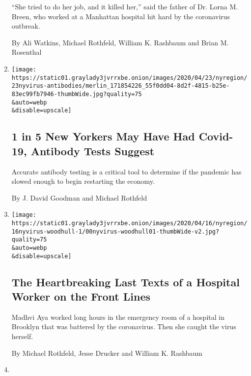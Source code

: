 \begin{enumerate}
  ``She tried to do her job, and it killed her,'' said the father of Dr.
  Lorna M. Breen, who worked at a Manhattan hospital hit hard by the
  coronavirus outbreak.

  By Ali Watkins, Michael Rothfeld, William K. Rashbaum and Brian M.
  Rosenthal
\item
  \href{/2020/04/23/nyregion/coronavirus-antibodies-test-ny.html}{}

  \texttt{[image: https://static01.graylady3jvrrxbe.onion/images/2020/04/23/nyregion/23nyvirus-antibodies/merlin\_171854226\_55f0dd04-8d2f-4815-b25e-83ec99fb7946-thumbWide.jpg?quality=75\\\&auto=webp\\\&disable=upscale]}

  \hypertarget{1-in-5-new-yorkers-may-have-had-covid-19-antibody-tests-suggest}{%
  \subsection{1 in 5 New Yorkers May Have Had Covid-19, Antibody Tests
  Suggest}\label{1-in-5-new-yorkers-may-have-had-covid-19-antibody-tests-suggest}}

  Accurate antibody testing is a critical tool to determine if the
  pandemic has slowed enough to begin restarting the economy.

  By J. David Goodman and Michael Rothfeld
\item
  \href{/2020/04/15/nyregion/coronavirus-woodhull-madhvi-aya-dead.html}{}

  \texttt{[image: https://static01.graylady3jvrrxbe.onion/images/2020/04/16/nyregion/16nyvirus-woodhull-1/00nyvirus-woodhull01-thumbWide-v2.jpg?quality=75\\\&auto=webp\\\&disable=upscale]}

  \hypertarget{the-heartbreaking-last-texts-of-a-hospital-worker-on-the-front-lines}{%
  \subsection{The Heartbreaking Last Texts of a Hospital Worker on the
  Front
  Lines}\label{the-heartbreaking-last-texts-of-a-hospital-worker-on-the-front-lines}}

  Madhvi Aya worked long hours in the emergency room of a hospital in
  Brooklyn that was battered by the coronavirus. Then she caught the
  virus herself.

  By Michael Rothfeld, Jesse Drucker and William K. Rashbaum
\item
  \href{/2020/04/08/nyregion/new-york-coronavirus-response-delays.html}{}


\end{enumerate}
